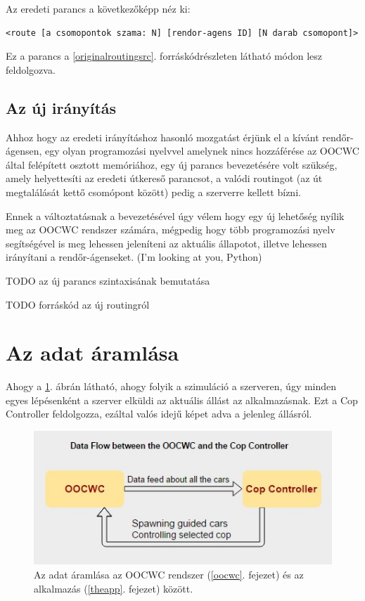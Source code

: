 \documentclass[a4paper,12pt]{report}
\begin{document}
\vspace{2mm}
Az eredeti parancs a következőképp néz ki: 
\begin{lstlisting}
<route [a csomopontok szama: N] [rendor-agens ID] [N darab csomopont]>
\end{lstlisting}

Ez a parancs a \ref{originalroutingsrc}. forráskódrészleten látható módon lesz feldolgozva.



\subsection{Az új irányítás}
\label{newrouting}

Ahhoz hogy az eredeti irányításhoz hasonló mozgatást érjünk el a kívánt rendőr-ágensen, egy olyan programozási nyelvvel amelynek nincs hozzáférése az OOCWC által felépített osztott memóriához, egy új parancs bevezetésére volt szükség, amely helyettesíti az eredeti útkereső parancsot, a valódi routingot (az út megtalálását kettő csomópont között) pedig a szerverre kellett bízni.

\vspace{2mm}
Ennek a változtatásnak a bevezetésével úgy vélem hogy egy új lehetőség nyílik meg az OOCWC rendszer számára, mégpedig hogy több programozási nyelv segítségével is meg lehessen jeleníteni az aktuális állapotot, illetve lehessen irányítani a rendőr-ágenseket. (I'm looking at you, Python)

\vspace{2mm}
TODO az új parancs szintaxisának bemutatása

TODO forráskód az új routingról

\section{Az adat áramlása}
\label{dataflow}

Ahogy a \ref{dataflowpicture}. ábrán látható, ahogy folyik a szimuláció a szerveren, úgy minden egyes lépésenként a szerver elküldi az aktuális állást az alkalmazásnak. Ezt a Cop Controller feldolgozza, ezáltal valós idejű képet adva a jelenleg állásról.

\begin{figure}[h]
\centerline{
\includegraphics[width=4.5in]{img/dataflow}}
\caption{Az adat áramlása az OOCWC rendszer (\ref{oocwc}. fejezet) és az alkalmazás (\ref{theapp}. fejezet) között.}
\label{dataflowpicture}
\end{figure}
\end{document}
